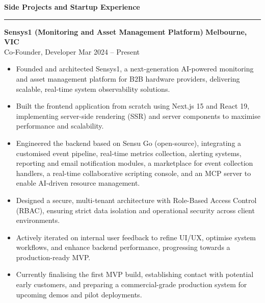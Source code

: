 \documentclass[11pt, letterpaper]{article}
\newcommand{\cvsection}[1]{
	\vspace{0.5em}
	\noindent\textbf{#1}\\[-0.5em] 
	\rule{\textwidth}{0.5pt}
	\vspace{0.5em}
}
\begin{document}
\cvsection{Side Projects and Startup Experience}
\scriptsize \textbf{Sensys1 (Monitoring and Asset Management Platform)} \hfill \textbf{Melbourne, VIC} \\[-0.6em]
\scriptsize {Co-Founder, Developer} \hfill Mar 2024 -- Present
\vspace{-0.5em}
\begin{itemize}
    \setlength\itemsep{-0.2em}
    \setlength\leftskip{-2em}
    \setlength{}
    \setlength\itemindent{0em}
    \item Founded and architected Sensys1, a next-generation AI-powered monitoring and asset management platform for B2B hardware providers, delivering scalable, real-time system observability solutions.
    \item Built the frontend application from scratch using Next.js 15 and React 19, implementing server-side rendering (SSR) and server components to maximise performance and scalability.
    \item Engineered the backend based on Sensu Go (open-source), integrating a customised event pipeline, real-time metrics collection, alerting systems, reporting and email notification modules, a marketplace for event collection handlers, a real-time collaborative scripting console, and an MCP server to enable AI-driven resource management.
    \item Designed a secure, multi-tenant architecture with Role-Based Access Control (RBAC), ensuring strict data isolation and operational security across client environments.
    \item Actively iterated on internal user feedback to refine UI/UX, optimise system workflows, and enhance backend performance, progressing towards a production-ready MVP.
    \item Currently finalising the first MVP build, establishing contact with potential early customers, and preparing a commercial-grade production system for upcoming demos and pilot deployments.
\end{itemize}
\vspace{0.5em}
\end{document}
